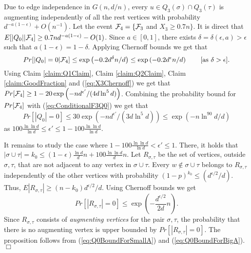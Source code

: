 \documentclass[a4paper,10pt]{article}
\newcommand{\qed}{\hfill$\Box$\smallskip}
\begin{document}
Due to edge independence in $G(n,d/n)$, every $u\in Q_3(\sigma)\cap Q_3(\tau)$
is augmenting independently of all the rest vertices  with probability 
$d^{-a(1-\epsilon)}+O(n^{-1})$. 
Let the event ${\cal F}_4=\{ {\cal F}_3$ and $X_3 \geq 0.7n \}$. It is direct
that $E[|Q_0||{\cal F}_4]\geq 0.7 nd^{-a(1-\epsilon)}-O(1)$.
Since $a \in [0,1]$, there exists $\delta=\delta(\epsilon,a)> \epsilon$ 
such that $a(1-\epsilon)=1-\delta$. Applying Chernoff bounds we get that
\begin{equation}\label{eq:ConditionalF3Q0}
Pr[|Q_0 |= 0 |{\cal F}_4]\leq \exp\left( -0.2 {d^{\delta}n}/{d} \right)\leq
\exp\left( -0.2 {d^{\epsilon}n}/{d} \right) \qquad \mbox{[as $\delta>\epsilon$].}
\end{equation}
Using Claim \ref{claim:Q1Claim}, Claim \ref{claim:Q2Claim}, Claim \ref{claim:GoodFraction} 
and (\ref{eq:X3Chernoff}) we get that $Pr[{\cal F}_4]\geq 1-20\exp\left(-n{d^{\epsilon'}}/(4d\ln^5 d)\right)$.
Combining the probability bound for $Pr[{\cal F}_4]$ with (\ref{eq:ConditionalF3Q0})
we get that
\begin{equation}\label{eq:Q0BoundForSmallA}
Pr[|Q_0| = 0]\leq 30\exp\left(-n{d^{\epsilon'}}/(3d\ln^5 d)\right)
\leq \exp\left(-n\ln^{90}d/d\right)
\end{equation}
as $100\frac{\ln\ln d}{\ln d}\leq \epsilon'\leq 1-100\frac{\ln\ln d}{\ln d}$.



It remains to study the case where $1-100\frac{\ln\ln d}{\ln d}<\epsilon'\leq 1$.
There, it holds that $|\sigma\cup \tau|=k_0\leq (1-\epsilon)
\frac{\ln d}{d}n+100\frac{\ln\ln d}{d}n$. Let $R_{\sigma,\tau}$ be the 
set of vertices, outside $\sigma, \tau$, that are not adjacent to any
vertex in $\sigma\cup \tau$. 
Every $w\notin \sigma\cup\tau$  belongs to $R_{\sigma,\tau}$ independently of the
other vertices with probability $(1-p)^{k_0}\leq \left(d^{\epsilon/2}/d \right)$.
Thus, $E|R_{\sigma,\tau}|\geq (n-k_0)d^{\epsilon/2}/d$. Using Chernoff bounds 
we get
\begin{equation}\label{eq:Q0BoundForBigA}
Pr[|R_{\sigma,\tau}|=0]\leq \exp\left( -\frac{d^{\epsilon/2}}{2d}n \right).
\end{equation}
Since $R_{\sigma,\tau}$ consists of {\em augmenting vertices} for
the pair $\sigma,\tau$, the probability that there is no augmenting
vertex is upper bounded by $Pr[|R_{\sigma,\tau}|=0]$. The proposition
follows from (\ref{eq:Q0BoundForSmallA}) and (\ref{eq:Q0BoundForBigA}).
 \qed \\
\end{document}

